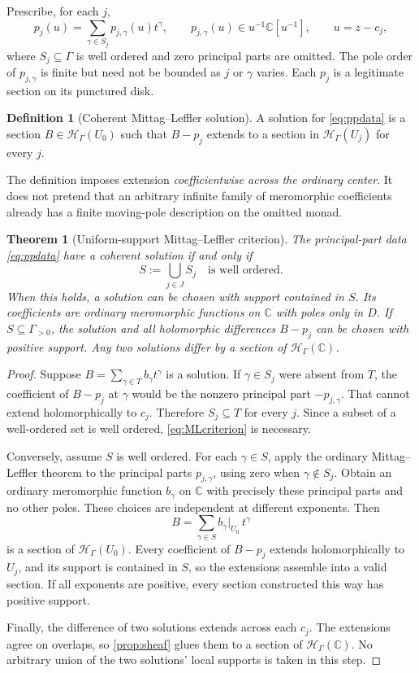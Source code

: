 \documentclass[11pt,letterpaper]{article}
\newtheorem{theorem}{Theorem}[section]
\theoremstyle{definition}
\newtheorem{definition}[definition]{Definition}
\theoremstyle{remark}
\newcommand{\C}{\mathbb C}
\newcommand{\HH}{\mathscr H_\Gamma}
\numberwithin{equation}{section}
\begin{document}
Prescribe, for each $j$,
\begin{equation}\label{eq:ppdata}
 p_j(u)=\sum_{\gamma\in S_j}p_{j,\gamma}(u)t^\gamma,
 \qquad p_{j,\gamma}(u)\in u^{-1}\C[u^{-1}],
 \qquad u=z-c_j,
\end{equation}
where $S_j\subseteq\Gamma$ is well ordered and zero principal parts are omitted. The pole order of $p_{j,\gamma}$ is finite but need not be bounded as $j$ or $\gamma$ varies. Each $p_j$ is a legitimate section on its punctured disk.

\begin{definition}[Coherent Mittag--Leffler solution]
A solution for \eqref{eq:ppdata} is a section $B\in\HH(U_0)$ such that $B-p_j$ extends to a section in $\HH(U_j)$ for every $j$.
\end{definition}
The definition imposes extension \emph{coefficientwise across the ordinary center}. It does not pretend that an arbitrary infinite family of meromorphic coefficients already has a finite moving-pole description on the omitted monad.

\begin{theorem}[Uniform-support Mittag--Leffler criterion]\label{thm:ML}
The principal-part data \eqref{eq:ppdata} have a coherent solution if and only if
\begin{equation}\label{eq:MLcriterion}
 S:=\bigcup_{j\in J}S_j\quad\text{is well ordered}.
\end{equation}
When this holds, a solution can be chosen with support contained in $S$. Its coefficients are ordinary meromorphic functions on $\C$ with poles only in $D$. If $S\subseteq\Gamma_{>0}$, the solution and all holomorphic differences $B-p_j$ can be chosen with positive support. Any two solutions differ by a section of $\HH(\C)$.
\end{theorem}
\begin{proof}
Suppose $B=\sum_{\gamma\in T}b_\gamma t^\gamma$ is a solution. If $\gamma\in S_j$ were absent from $T$, the coefficient of $B-p_j$ at $\gamma$ would be the nonzero principal part $-p_{j,\gamma}$. That cannot extend holomorphically to $c_j$. Therefore $S_j\subseteq T$ for every $j$. Since a subset of a well-ordered set is well ordered, \eqref{eq:MLcriterion} is necessary.

Conversely, assume $S$ is well ordered. For each $\gamma\in S$, apply the ordinary Mittag--Leffler theorem to the principal parts $p_{j,\gamma}$, using zero when $\gamma\notin S_j$. Obtain an ordinary meromorphic function $b_\gamma$ on $\C$ with precisely these principal parts and no other poles. These choices are independent at different exponents. Then
\[
 B=\sum_{\gamma\in S}b_\gamma|_{U_0}\,t^\gamma
\]
is a section of $\HH(U_0)$. Every coefficient of $B-p_j$ extends holomorphically to $U_j$, and its support is contained in $S$, so the extensions assemble into a valid section. If all exponents are positive, every section constructed this way has positive support.

Finally, the difference of two solutions extends across each $c_j$. The extensions agree on overlaps, so \cref{prop:sheaf} glues them to a section of $\HH(\C)$. No arbitrary union of the two solutions' local supports is taken in this step.
\end{proof}
\end{document}

